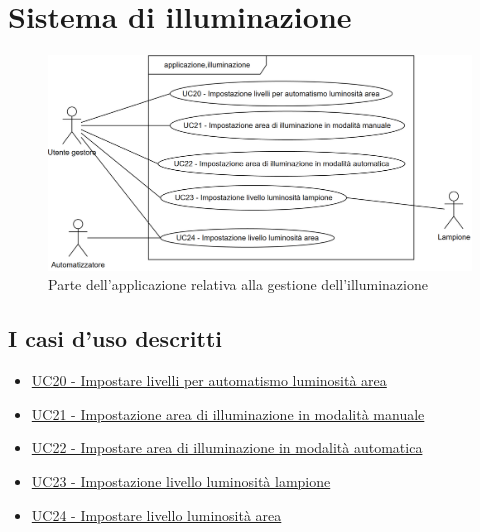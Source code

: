 \section{Sistema di illuminazione}

\begin{figure}[H]
    \includegraphics[width=\textwidth]{contenuti/img/casi_uso_grafici-applicazione,illuminazione.png}
    \caption{Parte dell'applicazione relativa alla gestione dell'illuminazione}
    \label{fig:illuminazione}
\end{figure}

\subsection{I casi d'uso descritti}

\begin{itemize}
    \item \hyperref[uc:20]{UC20 - Impostare livelli per automatismo luminosità area}
    \item \hyperref[uc:21]{UC21 - Impostazione area di illuminazione in modalità manuale}
    \item \hyperref[uc:22]{UC22 - Impostare area di illuminazione in modalità automatica}
    \item \hyperref[uc:23]{UC23 - Impostazione livello luminosità lampione}
    \item \hyperref[uc:24]{UC24 - Impostare livello luminosità area}
\end{itemize}
